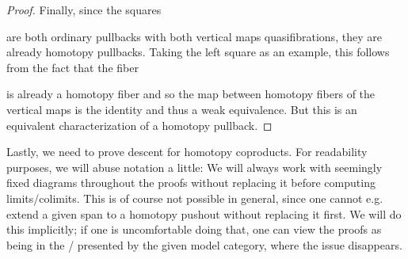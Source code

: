 \begin{prop}
\begin{proof}
        Finally, since the squares 
        \begin{center}
        \end{center}
        are both ordinary pullbacks %
        with both vertical maps quasifibrations, they are already homotopy pullbacks. %
        Taking the left square as an example, this follows from the fact that the fiber
        \begin{center}
        \end{center}
        is already a homotopy fiber and so the map between homotopy fibers of the vertical maps is the identity and thus a weak equivalence.
        But this is an equivalent characterization of a homotopy pullback. %
    \end{proof}
\end{prop}
Lastly, we need to prove descent for homotopy coproducts.
For readability purposes, we will abuse notation a little:
We will always work with seemingly fixed diagrams throughout the proofs without replacing it before computing limits/colimits.
This is of course not possible in general, since one cannot e.g. extend a given span to a homotopy pushout without replacing it first.
We will do this implicitly; if one is uncomfortable doing that, one can view the proofs as being in the \inftycat/ presented by the given model category, where the issue disappears.

